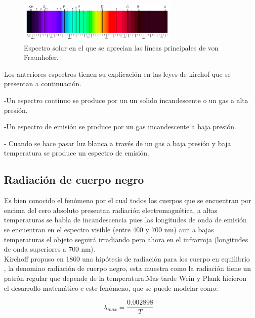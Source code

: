 \documentclass[11pt]{article}
\begin{document}
\begin{figure}[htb!]
\centering
\includegraphics[width=0.7\textwidth]{3}
\caption[Descripción versión comprimida]{Espectro solar en el que se aprecian las líneas principales de von Fraunhofer. \cite{articulo1}}
 \label{fig:fig6}
\end{figure}


Los anteriores espectros tienen su explicación en las leyes de kirchof  que se presentan a continuación.

-Un espectro continuo se produce por un un solido incandescente o un gas a alta presión.

-Un espectro de emisión se produce por un gas incandescente a baja presión.

- Cuando se hace pasar luz blanca a través de un gas a baja presión y baja temperatura se produce un espectro de emisión.

\subsection {Radiación de cuerpo negro}
Es bien conocido el fenómeno por el cual todos los cuerpos que se encuentran por encima del cero absoluto presentan radiación electromagnética, a altas temperaturas se habla de incandescencia pues las longitudes de onda de emisión se encuentran en el espectro visible (entre 400 y 700 nm) aun a bajas temperaturas  el objeto seguirá irradiando pero ahora en el infrarroja (longitudes de onda superiores a 700 nm).\cite{libro2} \\
Kirchoff propuso en 1860   una hipótesis  de radiación para los cuerpo en equilibrio , la denomino radiación de cuerpo negro, esta muestra como la radiación tiene un patrón regular que depende de la temperatura.Mas tarde  Wein y Plank  hicieron el desarrollo matemático e este fenómeno, que se puede modelar como:

\begin{center}
    \begin{equation}
        \lambda_{max}=\frac{0.002898}{T}
    \end{equation}{}
\end{center}{}
\end{document}
